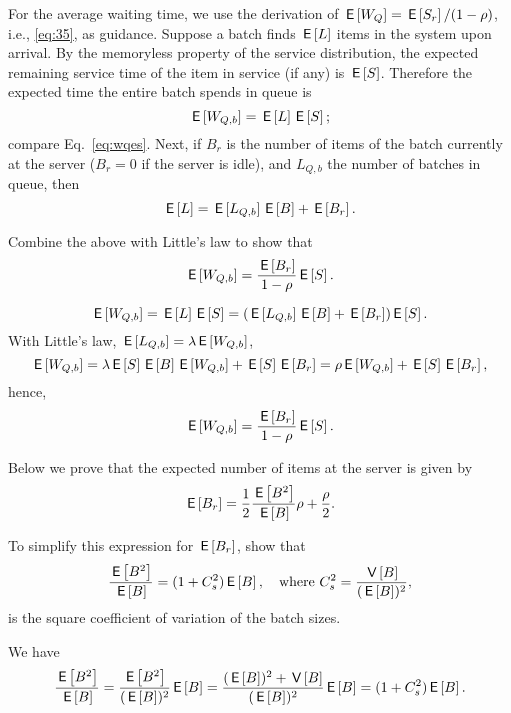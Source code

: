 For the average waiting time, we use the derivation of $\E{W_Q}=\E{S_r}/(1-\rho)$, i.e., \eqref{eq:35}, as guidance. Suppose a batch finds $\E{L}$ items in the system upon
arrival. By the memoryless property of the service distribution, the
expected remaining service time of the item in service (if any) is
$\E S$. Therefore the expected time the entire batch
spends in queue is
\begin{equation*}
  \E{W_{Q,b}} = \E{L} \E S;
\end{equation*}
compare Eq.~\ref{eq:wqes}. 
Next, if $B_r$ is the number of items of the batch currently at the server
($B_r=0$ if the server is idle), and $L_{Q,b}$ the number of batches
in queue, then
\begin{equation*}
  \E{L} = \E{L_{Q,b}}\E B + \E{B_r}.
\end{equation*}
\begin{exercise}
  Combine the above with  Little's law to show that
  \begin{equation*}
  \E{W_{Q,b}} = \frac{\E{B_r}}{1-\rho}\E{S}.
  \end{equation*}
\begin{solution}
\begin{equation*}
  \E{W_{Q,b}} 
= \E{L} \E S  = (\E{L_{Q,b}}\E B + \E{B_r})\E S.
\end{equation*}
With  Little's law, $\E{L_{Q,b}} = \lambda \E{W_{Q,b}}$,
\begin{equation*}
  \E{W_{Q,b}} 
= \lambda \E S \E B \E{W_{Q,b}} + \E S \E{B_r} = \rho \E{W_{Q,b}} + \E S \E{B_r},
\end{equation*}
hence,
\begin{equation*}
  \E{W_{Q,b}} = \frac{\E{B_r}}{1-\rho}\E S.
\end{equation*}
\end{solution}
\end{exercise}
Below we prove that  the expected number of items at the server is given by
\begin{equation}\label{eq:br}
  \E{B_r} = \frac 1 2 \frac{\E{B^2}}{\E B}\rho + \frac\rho2.
\end{equation}


\begin{exercise}\label{q:batch}
To simplify this expression for $\E{B_r}$, show that 
\begin{equation*}
  \frac{\E{B^2}}{\E{B}} = (1+C_s^2)\E B, \quad\text{where }
C_s^2 = \frac{\V B}{(\E B)^2},
\end{equation*}
is the square coefficient of variation of the batch sizes.  
  \begin{solution}
We have
\begin{equation*}
  \begin{split}
  \frac{\E{B^2}}{\E{B}}
=    \frac{\E{B^2}}{(\E B)^2} \E B 
= \frac{(\E B)^2+\V B}{(\E B)^2}\E B = (1+C_s^2)\E B.
  \end{split}
\end{equation*}
  \end{solution}
\end{exercise}

